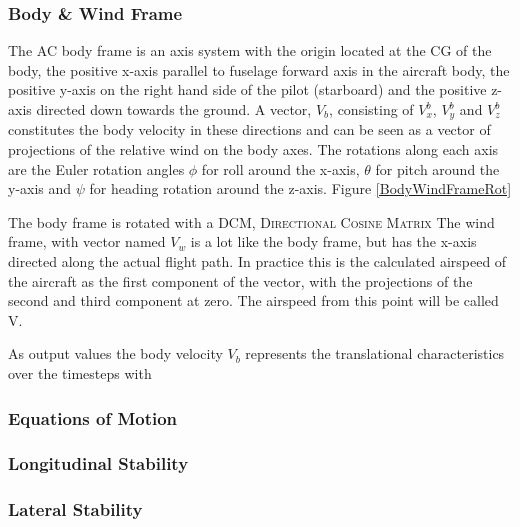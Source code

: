 \subsubsection{Body \& Wind Frame}

The AC body frame is an axis system with the origin located at the CG of the body, the positive x-axis parallel to fuselage forward axis in the aircraft body, the positive y-axis on the right hand side of the pilot (starboard) and the positive z-axis directed down towards the ground. A vector, \textbf{$V_b$}, consisting of $V^b_x$, $V^b_y$ and $V^b_z$ constitutes the body velocity in these directions and can be seen as a vector of projections of the relative wind on the body axes. The rotations along each axis are the Euler rotation angles $\phi$ for roll around the x-axis, $\theta$ for pitch around the y-axis and $\psi$ for heading rotation around the z-axis. Figure \ref{BodyWindFrameRot}

\label{BodyWindFrameRot}

The body frame is rotated with a \textsc{DCM, Directional Cosine Matrix}
The wind frame, with vector named \textbf{$V_w$} is a lot like the body frame, but has the x-axis directed along the actual flight path. In practice this is the calculated airspeed of the aircraft as the first component of the vector, with the projections of the second and third component at zero. The airspeed from this point will be called V.


As output values the body velocity \textbf{$V_b$} represents the translational characteristics over the timesteps with

\subsubsection{Equations of Motion}

\subsubsection{Longitudinal Stability}
\subsubsection{Lateral Stability}



